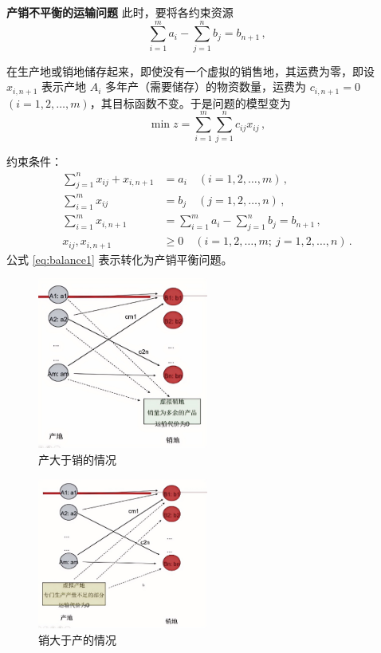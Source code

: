 \begin{exbox}{\textbf{产销不平衡的运输问题}}
    此时，要将各约束资源
    \begin{equation}
        \sum_{i=1}^{m} a_i - \sum_{j=1}^{n} b_j = b_{n+1} \,,
    \end{equation}
    
    在生产地或销地储存起来，即使没有一个虚拟的销售地，其运费为零，即设 $x_{i,n+1}$ 表示产地 $A_i$ 多年产（需要储存）的物资数量，运费为 $c_{i,n+1}=0$ $(i=1,2,\dots,m)$，其目标函数不变。于是问题的模型变为
    \begin{equation}
        \min z = \sum_{i=1}^{m} \sum_{j=1}^{n} c_{ij} x_{ij} \,,
    \end{equation}
    
    约束条件：
    \begin{align}
        \sum_{j=1}^{n} x_{ij} + x_{i,n+1} &= a_i \quad (i=1,2,\dots,m) \,, \label{eq:balance1} \\
        \sum_{i=1}^{m} x_{ij} &= b_j \quad (j=1,2,\dots,n) \,, \label{eq:balance2} \\
        \sum_{i=1}^{m} x_{i,n+1} &= \sum_{i=1}^{m} a_i - \sum_{j=1}^{n} b_j = b_{n+1} \,, \label{eq:balance3} \\
        x_{ij}, x_{i,n+1} &\geq 0 \quad (i=1,2,\dots,m;\ j=1,2,\dots,n) \,. \label{eq:Chapter3_nonneg_1}
    \end{align}
    公式 \eqref{eq:balance1} 表示转化为产销平衡问题。
\end{exbox}
\begin{figure}[H]
    \centering
    \includegraphics[width=0.5\textwidth]{./image/6.png}
    \caption{产大于销的情况}
    \label{fig:Chapter3_Temporary_Pavilion_2}
\end{figure}

\begin{figure}[H]
    \centering
    \includegraphics[width=0.5\textwidth]{./image/7.png}
    \caption{销大于产的情况}
    \label{fig:Chapter3_Temporary_Pavilion_3}
\end{figure}

